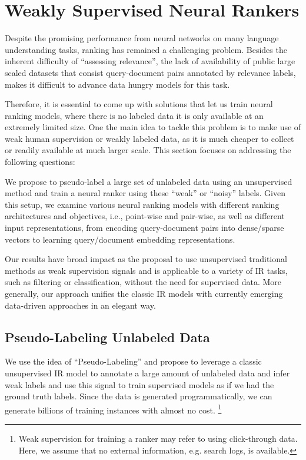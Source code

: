 \section{Weakly Supervised Neural Rankers}
\label{sec:weakly_supervised_neural_rankers}
Despite the promising performance from neural networks on many language understanding tasks, ranking has remained a challenging problem. Besides the inherent difficulty of ``assessing relevance'', the lack of availability of public large scaled datasets that consist query-document pairs annotated by relevance labels, makes it difficult to advance data hungry models for this task.

Therefore, it is essential to come up with solutions that let us train neural ranking models, where there is no labeled data it is only available at an extremely limited size. 
One the main idea to tackle this problem is to make use of weak human supervision or weakly labeled data, as it is much cheaper to collect or readily available at much larger scale. This section focuses on addressing the following questions:

We propose to pseudo-label a large set of unlabeled data using an unsupervised method and train a neural ranker using these ``weak'' or ``noisy'' labels. Given this setup, we examine various neural ranking models with different ranking architectures and objectives, i.e., point-wise and pair-wise, as well as different input representations, from encoding query-document pairs into dense\:/\:sparse vectors to learning query\:/\:document embedding representations. 

Our results have broad impact as the proposal to use unsupervised traditional methods as weak supervision signals and is applicable to a variety of IR tasks, such as filtering or classification, without the need for supervised data.  More generally, our approach unifies the classic IR models with currently emerging data-driven approaches in an elegant way.

\subsection{Pseudo-Labeling Unlabeled Data}
\label{sec:pseudo_labeling}
We use the idea of ``Pseudo-Labeling'' and propose to leverage a classic unsupervised IR model to annotate a large amount of unlabeled data and infer weak labels and use this signal to train supervised models as if we had the ground truth labels.
Since the data is generated programmatically, we can generate billions of training instances with almost no cost. 
\footnote{Weak supervision for training a ranker may refer to using click-through data. Here, we assume that no external information, e.g. search logs, is available.}

